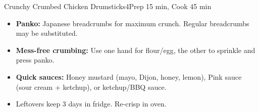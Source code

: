 \begin{recipebox}{Crunchy Crumbed Chicken Drumsticks}{4}{Prep 15 min, Cook 45 min}
\begin{notes}
\begin{itemize}
  \item \textbf{Panko:} Japanese breadcrumbs for maximum crunch. Regular breadcrumbs may be substituted.
  \item \textbf{Mess-free crumbing:} Use one hand for flour/egg, the other to sprinkle and press panko.
  \item \textbf{Quick sauces:} Honey mustard (mayo, Dijon, honey, lemon), Pink sauce (sour cream + ketchup), or ketchup/BBQ sauce.
  \item Leftovers keep 3 days in fridge. Re-crisp in oven.
\end{itemize}
\end{notes}
\end{recipebox}
